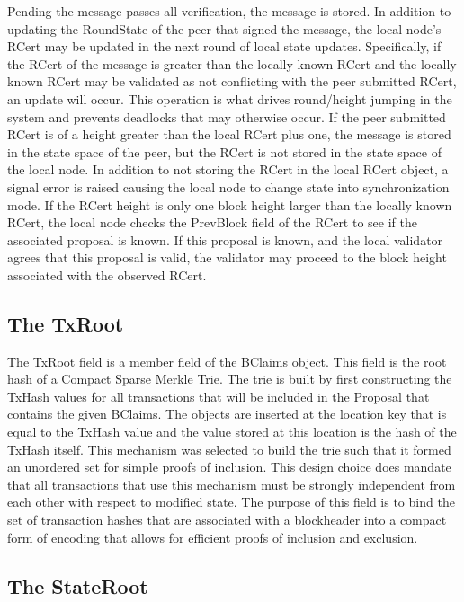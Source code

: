 Pending the message passes all verification, the message is stored.
In addition to updating the RoundState of the peer that signed the
message, the local node’s RCert may be updated in the next round of
local state updates.
Specifically, if the RCert of the message is greater than the locally
known RCert and the locally known RCert may be validated as not
conflicting with the peer submitted RCert, an update will occur.
This operation is what drives round/height jumping in the system and
prevents deadlocks that may otherwise occur.
If the peer submitted RCert is of a height greater than the local RCert
plus one, the message is stored in the state space of the peer, but the
RCert is not stored in the state space of the local node.
In addition to not storing the RCert in the local RCert object, a
signal error is raised causing the local node to change state into
synchronization mode.
If the RCert height is only one block height larger than the locally
known RCert, the local node checks the PrevBlock field of the RCert to
see if the associated proposal is known.
If this proposal is known, and the local validator agrees that this
proposal is valid, the validator may proceed to the block height
associated with the observed RCert.


\subsection{The TxRoot}

The TxRoot field is a member field of the BClaims object.
This field is the root hash of a Compact Sparse Merkle Trie.
The trie is built by first constructing the TxHash values for all
transactions that will be included in the Proposal that contains the
given BClaims.
The objects are inserted at the location key that is equal to the
TxHash value and the value stored at this location is the hash of the
TxHash itself.
This mechanism was selected to build the trie such that it formed an
unordered set for simple proofs of inclusion.
This design choice does mandate that all transactions that use this
mechanism must be strongly independent from each other with respect to
modified state.
The purpose of this field is to bind the set of transaction hashes that
are associated with a blockheader into a compact form of encoding that
allows for efficient proofs of inclusion and exclusion.


\subsection{The StateRoot}


